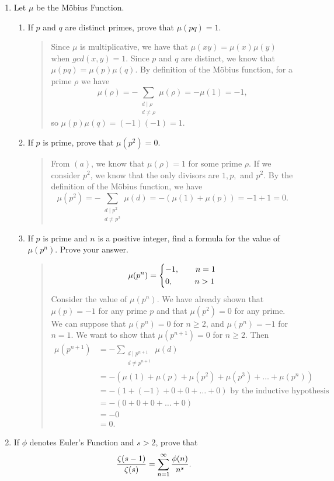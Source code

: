 \documentclass{hw}
\begin{document}
\begin{enumerate}
\item Let $\mu$ be the M\"{o}bius Function.
\begin{enumerate}
\item If $p$ and $q$ are distinct primes, prove that $\mu(pq)=1$.
\begin{quote}
Since $\mu$ is multiplicative, we have that $\mu(xy)=\mu(x)\mu(y)$ when $gcd(x,y)=1$. Since $p$ and
$q$ are distinct, we know that $\mu(pq)=\mu(p)\mu(q)$. By definition of the M\"{o}bius function, for
a prime $\rho$ we have
\[
\mu(\rho)=-\sum_{\substack{d\mid \rho\\d\neq\rho}}\mu(\rho)=-\mu(1)=-1,
\]
so $\mu(p)\mu(q)=(-1)(-1)=1$.
\end{quote}
\item If $p$ is prime, prove that $\mu(p^{2})=0$.
\begin{quote}
From $(a)$, we know that $\mu(\rho)=1$ for some prime $\rho$. If we consider $p^2$, we know that the
only divisors are $1,p,$ and $p^2$. By the definition of the M\"{o}bius function, we have
\[
\mu(p^2)=-\sum_{\substack{d\mid p^2\\d\neq p^2}}\mu(d)=-(\mu(1) + \mu(p))=-1 +1 = 0.
\]
\end{quote}
\item If $p$ is prime and $n$ is a positive integer, find a formula for the value of $\mu(p^{n})$.
Prove your answer.
\begin{quote}
\[
\mu(p^n)=
\begin{dcases*}
-1,\qquad n=1\\
0,\ \ \qquad n>1
\end{dcases*}
\]
Consider the value of $\mu(p^{n})$. We have already shown that $\mu(p)=-1$ for any prime $p$ and
that $\mu(p^2)=0$ for any prime. We can suppose that $\mu(p^{n})=0$ for $n\geq2$, and
$\mu(p^{n})=-1$ for $n=1$. We want to show that $\mu(p^{n+1})=0$ for $n\geq2$. Then
\begin{align*}
\mu(p^{n+1})&=-\sum_{\substack{d\mid p^{n+1}\\ d\neq p^{n+1}}}\mu(d)\\
&= -(\mu(1)+\mu(p)+\mu(p^{2})+\mu(p^{3})+\dots+\mu(p^{n}))\\
&= -(1+(-1)+0+0+\dots+0)\text{ by the inductive hypothesis}\\
&= -(0+0+0+\dots+0)\\
&= -0\\
&= 0.
\end{align*}
\end{quote}
\end{enumerate}

\item If $\phi$ denotes Euler's Function and $s>2$, prove that
\[
{\zeta(s-1)\over\zeta(s)}=\sum_{n=1}^{\infty}{\phi(n)\over n^{s}}.
\]
\end{enumerate}
\end{document}
